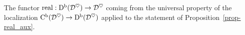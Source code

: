 \begin{definition}
\label{def-real}
\leanok
{}
The functor $\operatorname{real}:\operatorname{\mathrm{D}^b}(\mathcal{D}^\heartsuit)\to\mathcal{D}^\heartsuit$ coming from the universal property 
of the localization $\operatorname{\mathrm{C}^b}(\mathcal{D}^\heartsuit)\to\operatorname{\mathrm{D}^b}(\mathcal{D}^\heartsuit)$ applied to the
statement of Proposition~\ref{prop-real_aux}.

\end{definition}


